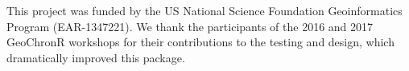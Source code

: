 \documentclass[gchron, manuscript]{copernicus}
\begin{document}
\begin{acknowledgements}
This project was funded by the US National Science Foundation Geoinformatics Program (EAR-1347221). We thank the participants of the 2016 and 2017 GeoChronR workshops for their contributions to the testing and design, which dramatically improved this package.
\end{acknowledgements}







\end{document}
